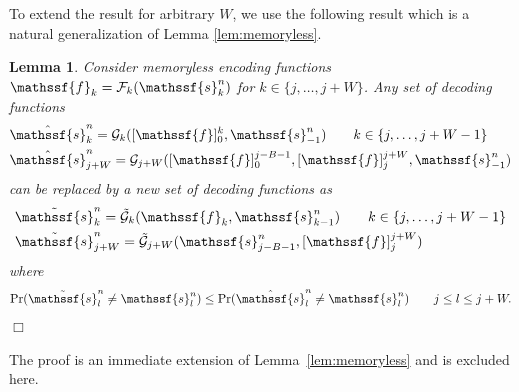 \documentclass[journal, twocolumn, 10pt]{IEEEtran}
\newtheorem{lemma}{Lemma}
\newcommand{\cF}{{\mathcal{F}}}
\newcommand{\cG}{{\mathcal{G}}}
\newcommand{\eps}{\varepsilon}
\newcommand{\rvf}{{\mathssf{f}}}    %
\newcommand{\rvs}{{\mathssf{s}}}    %
\begin{document}
To extend the result for arbitrary $W$, we use the following result which is a natural generalization of Lemma \ref{lem:memoryless}. %
{
\begin{lemma}
\label{lem:genW} 
Consider memoryless encoding functions $\rvf_k = \cF_k(\rvs_k^n)$ for $k\in\{j,\ldots,j+W\}$. Any set of decoding functions 
\begin{align}
&\hat{\rvs}_k^n = {\cG}_k([\rvf]_0^k,\rvs_{-1}^n) \qquad k\in\{j,\ldots,j+W-1\}\\
&\hat{\rvs}_{j+W}^n = {\cG}_{j+W}([\rvf]_0^{j-B-1}, [\rvf]_j^{j+W},\rvs_{-1}^n)
\end{align} 
can be replaced by a new set of decoding functions as
\begin{align}
&\tilde{\rvs}_k^n = \tilde{\cG}_k(\rvf_k,\rvs_{k-1}^n) \qquad k\in\{j,\ldots,j+W-1\}\\
&\tilde{\rvs}_{j+W}^n = \tilde{\cG}_{j+W}(\rvs^n_{j-B-1}, [\rvf]_j^{j+W})
\end{align} where 
\begin{align}
\Pr(\tilde{\rvs}_{l}^n\neq {\rvs}_{l}^n) \le \Pr(\hat{\rvs}_{l}^n\neq {\rvs}_{l}^n) \qquad j\le l\le j+W.
\end{align} \hfill$\Box$
\end{lemma}

The proof is an immediate extension of Lemma~\ref{lem:memoryless} and is excluded here.}
\end{document}
